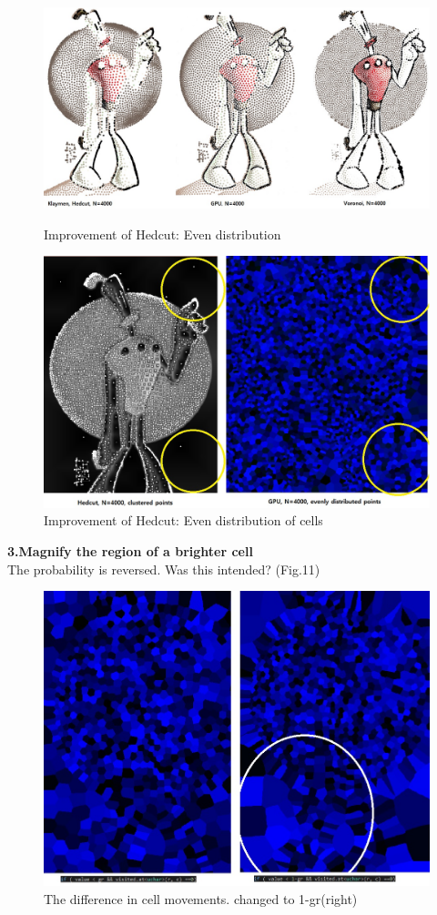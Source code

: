 \documentclass[11pt]{article}
\begin{document}
\begin{figure}[h]
\center
  \includegraphics[width=160mm]{compare3(3).jpg}
  \caption{Improvement of Hedcut: Even distribution}\label{compare1h}
 \includegraphics[width=160mm]{compare3(3-2).jpg}
  \caption{Improvement of Hedcut: Even distribution of cells}\label{GPU1}
\end{figure}

\textbf{3.Magnify the region of a brighter cell}\\
The probability is reversed. Was this intended? (Fig.11)
\begin{figure}[h]
\center
  \includegraphics[width=140mm]{improvement4.jpg}
  \caption{The difference in cell movements. changed to 1-gr(right)}\label{compare1h}
\end{figure}
\end{document}
